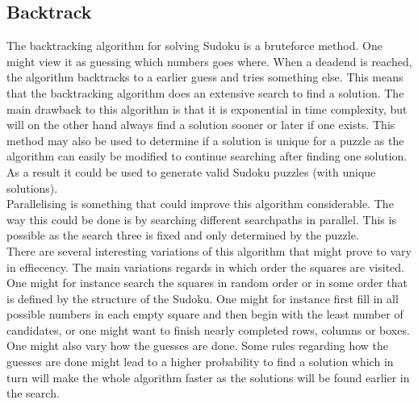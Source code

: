 \documentclass[a4paper,11pt]{kth-mag}
\begin{document}
\subsection{Backtrack}
The backtracking algorithm for solving Sudoku is a bruteforce method.
One might view it as guessing which numbers goes where.
When a deadend is reached, the algorithm backtracks to a earlier guess and tries something else.
This means that the backtracking algorithm does an extensive search to find a solution.
The main drawback to this algorithm is that it is exponential in time complexity, but will on the other hand always find a solution sooner or later if one exists.
This method may also be used to determine if a solution is unique for a puzzle as the algorithm can easily be modified to continue searching after finding one solution.
As a result it could be used to generate valid Sudoku puzzles (with unique solutions).\\
Parallelising is something that could improve this algorithm considerable.
The way this could be done is by searching different searchpaths in parallel. This is possible as the search three is fixed and only determined by the puzzle.\\
There are several interesting variations of this algorithm that might prove to vary in effiecency.
The main variations regards in which order the squares are visited.
One might for instance search the squares in random order or in some order that is defined by the structure of the Sudoku.
One might for instance first fill in all possible numbers in each empty square and then begin with the least number of candidates, or one might want to finish nearly completed rows, columns or boxes.
One might also vary how the guesses are done.
Some rules regarding how the guesses are done might lead to a higher probability to find a solution which in turn will make the whole algorithm faster as the solutions will be found earlier in the search.
\end{document}
